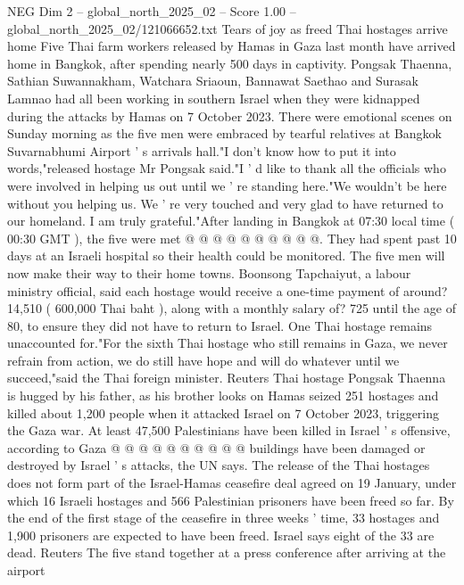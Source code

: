\begin{textsample}{NEG Dim 2 – global\_north\_2025\_02 – Score 1.00 – global\_north\_2025\_02/121066652.txt}  \label{ex:f2_neg_004}
Tears of joy as freed Thai hostages arrive home Five Thai farm workers released by Hamas in Gaza last month have arrived home in Bangkok, after spending nearly 500 days in captivity.
Pongsak Thaenna, Sathian Suwannakham, Watchara Sriaoun, Bannawat Saethao and Surasak Lamnao had all been working in southern Israel when they were kidnapped during the attacks by Hamas on 7 October 2023.
There were emotional scenes on Sunday morning as the five men were embraced by tearful relatives at Bangkok Suvarnabhumi Airport ' s arrivals hall."I don't know how to put it into words,"released hostage Mr Pongsak said."I ' d like to thank all the officials who were involved in helping us out until we ' re standing here."We wouldn't be here without you helping us.
We ' re very touched and very glad to have returned to our homeland.
I am truly grateful."After landing in Bangkok at 07:30 local time ( 00:30 GMT ), the five were met @ @ @ @ @ @ @ @ @ @.
They had spent past 10 days at an Israeli hospital so their health could be monitored.
The five men will now make their way to their home towns.
Boonsong Tapchaiyut, a labour ministry official, said each hostage would receive a one-time payment of around? 14,510 ( 600,000 Thai baht ), along with a monthly salary of? 725 until the age of 80, to ensure they did not have to return to Israel.
One Thai hostage remains unaccounted for."For the sixth Thai hostage who still remains in Gaza, we never refrain from action, we do still have hope and will do whatever until we succeed,"said the Thai foreign minister.
Reuters Thai hostage Pongsak Thaenna is hugged by his father, as his brother looks on Hamas seized 251 hostages and killed about 1,200 people when it attacked Israel on 7 October 2023, triggering the Gaza war.
At least 47,500 Palestinians have been killed in Israel ' s offensive, according to Gaza @ @ @ @ @ @ @ @ @ @ buildings have been damaged or destroyed by Israel ' s attacks, the UN says.
The release of the Thai hostages does not form part of the Israel-Hamas ceasefire deal agreed on 19 January, under which 16 Israeli hostages and 566 Palestinian prisoners have been freed so far.
By the end of the first stage of the ceasefire in three weeks ' time, 33 hostages and 1,900 prisoners are expected to have been freed.
Israel says eight of the 33 are dead.
Reuters The five stand together at a press conference after arriving at the airport

\end{textsample}
